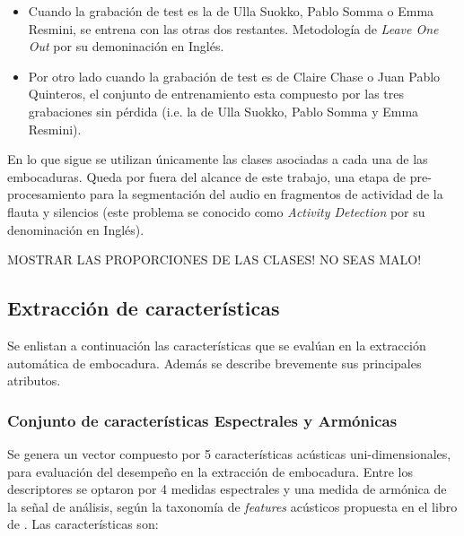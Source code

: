 \documentclass{article}
\begin{document}
\begin{itemize} 
  \item Cuando la grabación de test es la de Ulla Suokko, Pablo Somma o Emma Resmini, se entrena con las otras dos restantes. Metodología de \textit{Leave One Out} por su demoninación en Inglés.
  \item Por otro lado cuando la grabación de test es de Claire Chase o Juan Pablo Quinteros, el conjunto de entrenamiento esta compuesto por las tres grabaciones sin pérdida (i.e. la de Ulla Suokko, Pablo Somma y Emma Resmini).
\end{itemize}

En lo que sigue se utilizan únicamente las clases asociadas a cada una de las embocaduras. Queda por fuera del alcance de este trabajo, una etapa de pre-procesamiento para la segmentación del audio en fragmentos de actividad de la flauta y silencios (este problema se conocido como \textit{Activity Detection} por su denominación en Inglés). 
\medskip 

MOSTRAR LAS PROPORCIONES DE LAS CLASES! NO SEAS MALO!

\subsection{Extracción de características}
\label{descriptores}
Se enlistan a continuación las características que se evalúan en la extracción automática de embocadura. Además se describe brevemente sus principales atributos.

\subsubsection{Conjunto de características Espectrales y Armónicas} 
Se genera un vector compuesto por 5 características acústicas uni-dimensionales, para evaluación del desempeño en la extracción de embocadura. Entre los descriptores se optaron por 4 medidas espectrales y una medida de armónica de la señal de análisis, según la taxonomía de \textit{features} acústicos propuesta en el libro de \cite{klapuri2007signal}. Las características son: 
\end{document}

